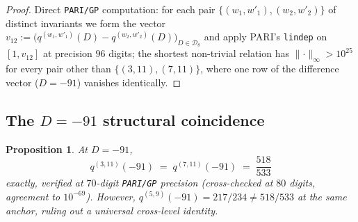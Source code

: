 \documentclass[11pt,a4paper]{amsart}
\theoremstyle{plain}
\newtheorem{proposition}[theorem]{Proposition}
\theoremstyle{definition}
\newcommand{\qstr}[2]{q^{(#1,#2)}}
\begin{document}
\begin{proof}
Direct \texttt{PARI/GP} computation: for each pair $\{(w_1, w'_1), (w_2,
w'_2)\}$ of distinct invariants we form the vector
$v_{12} := \bigl(\qstr{w_1}{w'_1}(D) - \qstr{w_2}{w'_2}(D)\bigr)_{D\in\mathcal
D_8}$ and apply PARI's \texttt{lindep} on $[1, v_{12}]$ at precision $96$ digits; the
shortest non-trivial relation has $\lVert\cdot\rVert_\infty > 10^{25}$ for
every pair other than $\{(3, 11), (7, 11)\}$, where one row of the
difference vector ($D = -91$) vanishes identically.
\end{proof}

\subsection{The $D = -91$ structural coincidence}\label{ss:indep-D91}

\begin{proposition}\label{prop:D91-id}
At $D = -91$,
\begin{equation}\label{eq:D91-id}
   \qstr{3}{11}(-91) \;=\; \qstr{7}{11}(-91) \;=\; \frac{518}{533}
\end{equation}
exactly, verified at $70$-digit \texttt{PARI/GP} precision (cross-checked at
$80$ digits, agreement to $10^{-69}$).
However,
$\qstr{5}{9}(-91) = 217/234 \neq 518/533$ at the same anchor, ruling out
a universal cross-level identity.
\end{proposition}
\end{document}
